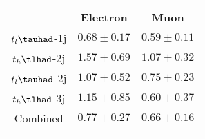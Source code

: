 \centering
\begin{tabular}{ccc} \toprule\toprule
 & Electron & Muon\\\midrule
$t_{l}\tauhad$-1j & $0.68\pm0.17$ & $0.59\pm0.11$\\
$t_{h}\tlhad$-2j & $1.57\pm0.69$ & $1.07\pm0.32$\\
$t_{l}\tauhad$-2j & $1.07\pm0.52$ & $0.75\pm0.23$\\
$t_{h}\tlhad$-3j & $1.15\pm0.85$ & $0.60\pm0.37$\\
Combined & $0.77\pm0.27$ & $0.66\pm0.16$\\
\bottomrule\bottomrule\\
\end{tabular}
